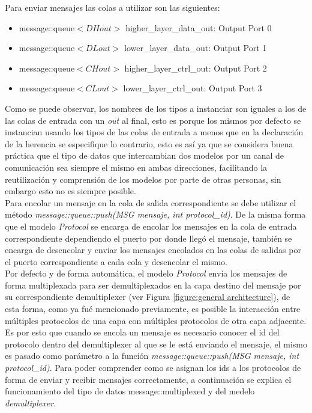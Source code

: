 \documentclass[10pt,a4paper]{article}
\begin{document}
Para enviar mensajes las colas a utilizar son las siguientes:
\begin{itemize}
\item message::queue$<DHout>$ higher\_layer\_data\_out: Output Port 0 
\item message::queue$<DLout>$ lower\_layer\_data\_out:  Output Port 1
\item message::queue$<CHout>$ higher\_layer\_ctrl\_out: Output Port 2
\item message::queue$<CLout>$ lower\_layer\_ctrl\_out:  Output Port 3
\end{itemize}

Como se puede observar, los nombres de los tipos a instanciar son iguales a los de las colas de entrada con un \textit{out} al final, esto es porque los mismos por defecto se instancian usando los tipos de las colas de entrada a menos que en la declaración de la herencia se especifique lo contrario, esto es así ya que se considera buena práctica que el tipo de datos que intercambian dos modelos por un canal de comunicación sea siempre el mismo en ambas direcciones, facilitando la reutilización y comprensión de los modelos por parte de otras personas, sin embargo esto no es siempre posible. \\

Para encolar un mensaje en la cola de salida correspondiente se debe utilizar el método \textit{message::queue::push(MSG mensaje, int protocol\_id)}. De la misma forma que el modelo \textit{Protocol} se encarga de encolar los mensajes en la cola de entrada correspondiente dependiendo el puerto por donde llegó el mensaje, también se encarga de desencolar y enviar los mensajes encolados en las colas de salidas por el puerto correspondiente a cada cola y desencolar el mismo. \\

Por defecto y de forma automática, el modelo \textit{Protocol} envía los mensajes de forma multiplexada para ser demultiplexados en la capa destino del mensaje por su correspondiente demultiplexer (ver Figura \ref{figure:general architecture}), de esta forma, como ya fué mencionado previamente, es posible la interacción entre múltiples protocolos de una capa con múltiples protocolos de otra capa adjacente. Es por esto que cuando se encola un mensaje es necesario conocer el id del protocolo dentro del demultiplexer al que se le está enviando el mensaje, el mismo es pasado como parámetro a la función \textit{message::queue::push(MSG mensaje, int protocol\_id)}. Para poder comprender como se asignan los ids a los protocolos de forma de enviar y recibir mensajes correctamente, a continuación se explica el funcionamiento del tipo de datos message::multiplexed y del medelo \textit{demultiplexer}. \\
\end{document}
